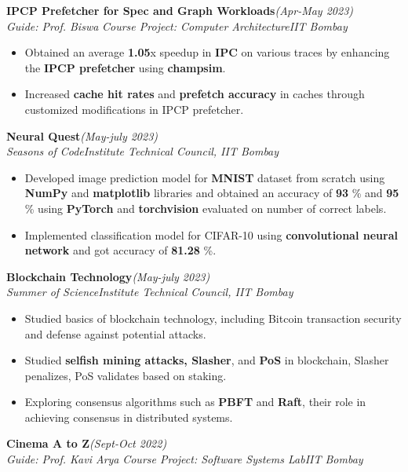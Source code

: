\documentclass[10pt]{article}
\begin{document}
{\selectfont
		\textbf{{IPCP Prefetcher for Spec and Graph Workloads}}\hfill{\sl \small (Apr-May 2023)}\\
	}{\it Guide: Prof. Biswa \textbar} {\it Course Project:  Computer Architecture}\hfill{\sl \small IIT Bombay}\\
	\begin{itemize}[itemsep = -0.8 mm, leftmargin=*]
		\vspace{-16pt}
		\item Obtained an average \textbf{1.05}x speedup in \textbf{IPC} on various traces by enhancing the \textbf{IPCP prefetcher} using \textbf{champsim}.
		\item Increased \textbf{cache hit rates} and \textbf{prefetch accuracy} in caches through customized modifications in IPCP prefetcher.
	\end{itemize}
{\selectfont
		\textbf{{Neural Quest}}\hfill{\sl \small (May-july 2023)}\\
	}{\it Seasons of Code}\hfill{\sl \small Institute Technical Council, IIT Bombay}\\

		\begin{itemize}[itemsep = -0.8 mm, leftmargin=*]
		\vspace{-16pt}
		\item Developed image prediction model for \textbf{MNIST} dataset from scratch using \textbf{NumPy} and \textbf{matplotlib} libraries
  and obtained an accuracy of \textbf{93} \% and \textbf{95} \% using \textbf{PyTorch} and \textbf{torchvision} evaluated on number of correct labels.
		\item Implemented classification model for CIFAR-10 using \textbf{convolutional neural network} and got accuracy of \textbf{81.28} \%.
	\end{itemize}
 {\selectfont
		\textbf{{Blockchain Technology}}\hfill{\sl \small (May-july 2023)}\\
	}{\it Summer of Science}\hfill{\sl \small Institute Technical Council, IIT Bombay}\\

		\begin{itemize}[itemsep = -0.8 mm, leftmargin=*]
		\vspace{-16pt}
		\item  Studied basics of blockchain technology, including Bitcoin transaction security and defense against potential attacks.
  \item Studied \textbf{selfish mining attacks, Slasher}, and \textbf{PoS} in blockchain, Slasher penalizes, PoS validates based on staking.
  \item Exploring consensus algorithms such as \textbf{PBFT} and \textbf{Raft}, their role in achieving consensus in distributed systems.
	\end{itemize}
{\selectfont
		\textbf{{Cinema A to Z}}\hfill{\sl \small (Sept-Oct 2022)}\\
	}{\it Guide: Prof. Kavi Arya \textbar} {\it Course Project: Software Systems Lab}\hfill{\sl \small IIT Bombay}\\
\end{document}
